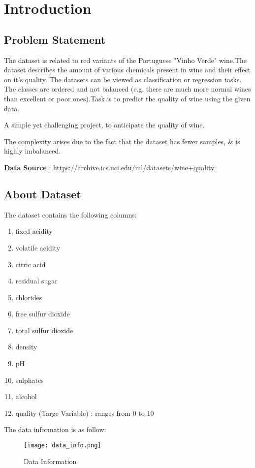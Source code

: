 \chapter{Introduction}
\section{Problem Statement}
The dataset is related to red variants of the Portuguese "Vinho Verde" wine.The dataset describes the amount of various chemicals present in wine and their effect on it's quality. The datasets can be viewed as classification or regression tasks. The classes are ordered and not balanced (e.g. there are much more normal wines than excellent or poor ones).Task is to predict the quality of wine using the given data.

A simple yet challenging project, to anticipate the quality of wine.

The complexity arises due to the fact that the dataset has fewer samples, \& is highly imbalanced.

\textbf{Data Source} : \href{https://archive.ics.uci.edu/ml/datasets/wine+quality}{https://archive.ics.uci.edu/ml/datasets/wine+quality}

\section{About Dataset}
The dataset contains the following columns:
\begin{enumerate}
    \item fixed acidity
    \item volatile acidity
    \item citric acid
    \item residual sugar
    \item chlorides
    \item free sulfur dioxide
    \item total sulfur dioxide
    \item density
    \item pH
    \item sulphates
    \item alcohol
    \item quality (Targe Variable) : ranges from 0 to 10
\end{enumerate}

The data information is as follow:
\begin{figure}[H]
    \centering
    \texttt{[image: data\_info.png]}
    \caption{Data Information}
    \label{fig:Data Information}
\end{figure}





